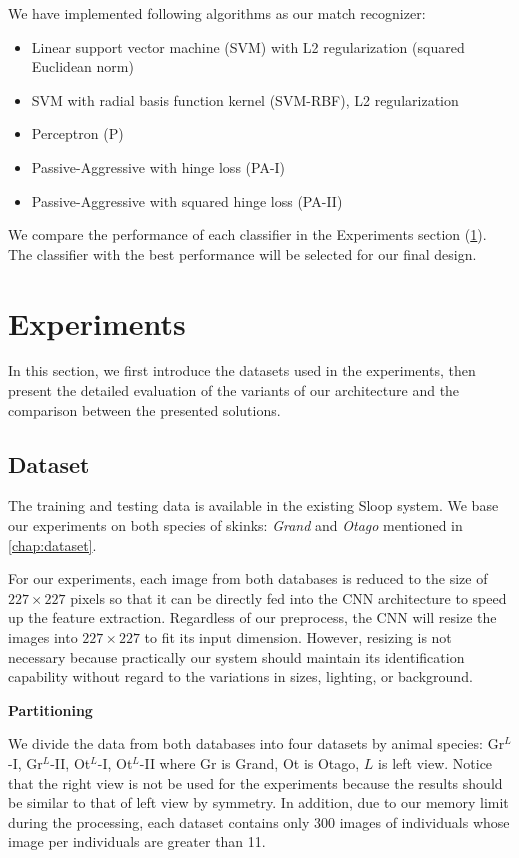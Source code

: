 We have implemented following algorithms as our match recognizer:
\begin{itemize}
  \item Linear support vector machine (SVM) with L2 regularization (squared Euclidean norm)
  \item SVM with radial basis function kernel (SVM-RBF), L2 regularization
  \item Perceptron (P)
  \item Passive-Aggressive with hinge loss (PA-I)
  \item Passive-Aggressive with squared hinge loss (PA-II)
\end{itemize}

We compare the performance of each classifier in the Experiments section (\ref{experiments}). The classifier with the best performance will be selected for our final design.

\section{Experiments} \label{experiments}

In this section, we first introduce the datasets used in the experiments, then present the detailed evaluation of the variants of our architecture and the comparison between the presented solutions.

\subsection{Dataset}

The training and testing data is available in the existing Sloop system. We base our experiments on both species of skinks: \emph{Grand} and \emph{Otago} mentioned in \ref{chap:dataset}.

For our experiments, each image from both databases is reduced to the size of $227 \times 227$ pixels so that it can be directly fed into the CNN architecture to speed up the feature extraction. Regardless of our preprocess, the CNN will resize the images into $227 \times 227$ to fit its input dimension. However, resizing is not necessary because practically our system should maintain its identification capability without regard to the variations in sizes, lighting, or background.

\textbf{Partitioning}

We divide the data from both databases into four datasets by animal species: Gr$^{L}$-I, Gr$^{L}$-II, Ot$^{L}$-I, Ot$^{L}$-II where Gr is Grand, Ot is Otago, $L$ is left view. Notice that the right view is not be used for the experiments because the results should be similar to that of left view by symmetry. In addition, due to our memory limit during the processing, each dataset contains only 300 images of individuals whose image per individuals are greater than 11.

